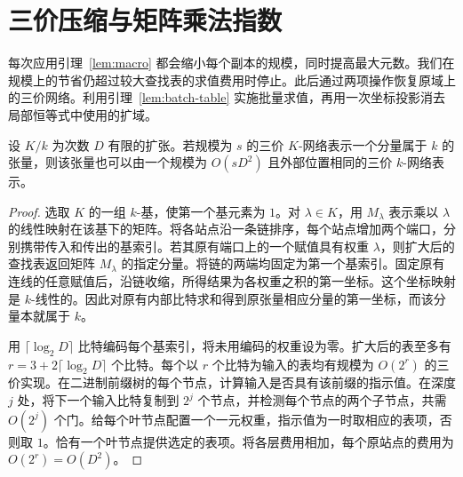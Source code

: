 \section{三价压缩与矩阵乘法指数}\label{sec:shaving}

每次应用引理~\ref{lem:macro} 都会缩小每个副本的规模，同时提高最大元数。我们在规模上的节省仍超过较大查找表的求值费用时停止。此后通过两项操作恢复原域上的三价网络。利用引理~\ref{lem:batch-table} 实施批量求值，再用一次坐标投影消去局部恒等式中使用的扩域。

\begin{lemma}[三价网络的下降]\label{lem:table-descent}
设 $K/k$ 为次数 $D$ 有限的扩张。若规模为 $s$ 的三价 $K$-网络表示一个分量属于 $k$ 的张量，则该张量也可以由一个规模为 $O(sD^2)$ 且外部位置相同的三价 $k$-网络表示。
\end{lemma}

\begin{proof}
选取 $K$ 的一组 $k$-基，使第一个基元素为 $1$。对 $\lambda\in K$，用 $M_\lambda$ 表示乘以 $\lambda$ 的线性映射在该基下的矩阵。将各站点沿一条链排序，每个站点增加两个端口，分别携带传入和传出的基索引。若其原有端口上的一个赋值具有权重 $\lambda$，则扩大后的查找表返回矩阵 $M_\lambda$ 的指定分量。将链的两端均固定为第一个基索引。固定原有连线的任意赋值后，沿链收缩，所得结果为各权重之积的第一坐标。这个坐标映射是 $k$-线性的。因此对原有内部比特求和得到原张量相应分量的第一坐标，而该分量本就属于 $k$。

用 $\lceil\log_2 D\rceil$ 比特编码每个基索引，将未用编码的权重设为零。扩大后的表至多有 $r=3+2\lceil\log_2 D\rceil$ 个比特。每个以 $r$ 个比特为输入的表均有规模为 $O(2^r)$ 的三价实现。在二进制前缀树的每个节点，计算输入是否具有该前缀的指示值。在深度 $j$ 处，将下一个输入比特复制到 $2^j$ 个节点，并检测每个节点的两个子节点，共需 $O(2^j)$ 个门。给每个叶节点配置一个一元权重，指示值为一时取相应的表项，否则取 $1$。恰有一个叶节点提供选定的表项。将各层费用相加，每个原站点的费用为 $O(2^r)=O(D^2)$。
\end{proof}

